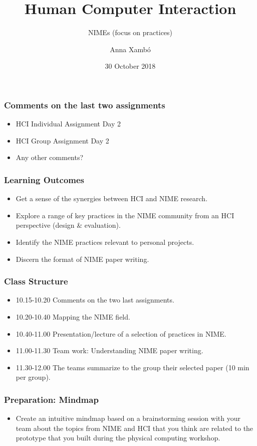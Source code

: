 \documentclass[screen, aspectratio=43]{beamer}
\title[HCI-intro]{Human Computer Interaction}
\subtitle{NIMEs (focus on practices)}
\author[A. Xamb{\'o}]{Anna Xamb{\'o}}
\institute[NTNU]{Department of Music, NTNU}
\date{30 October 2018}
\begin{document}
\begin{frame}
  \titlepage
\end{frame}

\begin{frame}
\frametitle{Comments on the last two assignments}
\begin{itemize}
\item HCI Individual Assignment Day 2
\item HCI Group Assignment Day 2
\item Any other comments?
\end{itemize}
\end{frame}
%
\begin{frame}
\frametitle{Learning Outcomes}
\begin{itemize}
\item Get a sense of the synergies between HCI and NIME research.
\item Explore a range of key practices in the NIME community from an HCI perspective (design \& evaluation).
\item Identify the NIME practices relevant to personal projects.
\item Discern the format of NIME paper writing.
\end{itemize}
\end{frame}
%
\begin{frame}
\frametitle{Class Structure}
\begin{itemize}
\item 10.15-10.20 Comments on the two last assignments.
\item 10.20-10.40 Mapping the NIME field.
\item 10.40-11.00 Presentation/lecture of a selection of practices in NIME.
\item 11.00-11.30 Team work: Understanding NIME paper writing.
\item 11.30-12.00 The teams summarize to the group their selected paper (10 min per group). 
\end{itemize}
\end{frame}
%
\begin{frame}
\frametitle{Preparation: Mindmap}
\begin{itemize}
\item Create an intuitive mindmap based on a brainstorming session with your team about the topics from NIME and HCI that you think are related to the prototype that you built during the physical computing workshop.
\end{itemize}
\end{frame}
\end{document}
